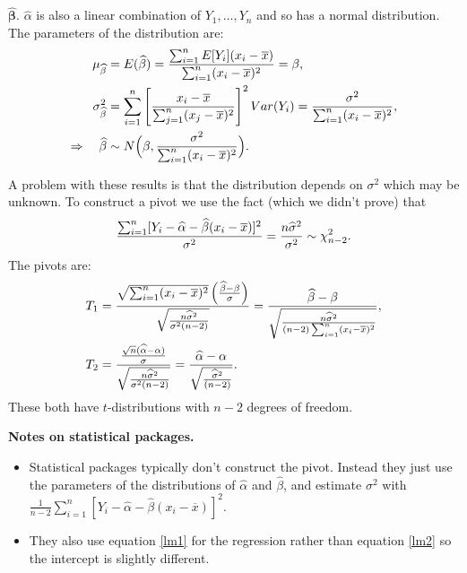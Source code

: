 \documentclass[10pt, two column]{article}
\begin{document}
$\boldsymbol{\widehat{\beta}}$. $\widehat{\alpha}$ is also a linear combination of $Y_{1}, \dots, Y_{n}$ and so has a normal distribution. The parameters of the distribution are: \vspace{-6pt}
\begin{align*}
\mu_{\widehat{\beta}} &= E(\widehat{\beta}) = \frac{\sum_{i=1}^{n} E[Y_{i}](x_{i} - \overline{x})}{\sum_{i=1}^{n} (x_{i} - \overline{x})^{2}} = \beta, \\
\sigma_{\widehat{\beta}}^{2} &= \sum_{i=1}^{n} \left[ \frac{x_{i} - \overline{x}}{\sum_{j=1}^{n} (x_{j} - \overline{x})^{2}} \right]^{2} Var(Y_{i}) = \frac{\sigma^{2}}{\sum_{i=1}^{n} (x_{i} - \overline{x})^{2}}, \\
\Rightarrow \quad \widehat{\beta} &\sim N\Big( \beta, \frac{\sigma^{2}}{\sum_{i=1}^{n} (x_{i} - \overline{x})^{2}} \Big). \vspace{-6pt}
\end{align*}

A problem with these results is that the distribution depends on $\sigma^{2}$ which may be unknown. To construct a pivot we use the fact (which we didn't prove) that \vspace{-6pt}
\begin{equation}
\frac{\sum_{i=1}^{n} [Y_{i} - \widehat{\alpha} - \widehat{\beta}(x_{i} - \overline{x})]^{2}}{\sigma^{2}} = \frac{n\widehat{\sigma}^{2}}{\sigma^{2}} \sim \chi_{n-2}^{2}. \label{vardist}
\vspace{-6pt}
\end{equation}
The pivots are: \vspace{-6pt}
\begin{align}
T_{1} &= \frac{\sqrt{\sum_{i=1}^{n} (x_{i} - \overline{x})^{2}}\left( \frac{\widehat{\beta} - \beta}{\sigma} \right)}{\sqrt{\frac{n\widehat{\sigma}^{2}}{\sigma^{2}(n-2)}}} = \frac{\widehat{\beta} - \beta}{\sqrt{ \frac{n\widehat{\sigma}^{2}}{(n-2)\sum_{i=1}^{n} (x_{i} - \overline{x})^{2}} }}, \label{dist alpha} \\
T_{2} &= \frac{ \frac{\sqrt{n}(\widehat{\alpha} - \alpha)}{\sigma} }{\sqrt{\frac{n\widehat{\sigma}^{2}}{\sigma^{2}(n-2)}}} = \frac{\widehat{\alpha} - \alpha}{\sqrt{ \frac{\widehat{\sigma}^{2}}{(n-2)} }}. \label{dist beta} \vspace{-6pt}
\end{align}
These both have $t$-distributions with $n-2$ degrees of freedom. 

{\bf Notes on statistical packages.}
\begin{itemize}
\item Statistical packages typically don't construct the pivot. Instead they just use the parameters of the distributions of $\widehat{\alpha}$ and $\widehat{\beta}$, and estimate $\sigma^{2}$ with $\frac{1}{n-2} \sum_{i=1}^{n} [Y_{i} - \widehat{\alpha} - \widehat{\beta}(x_{i} - \overline{x})]^{2}$. 
\item They also use equation \eqref{lm1} for the regression rather than equation \eqref{lm2} so the intercept is slightly different. 
\end{itemize}
\end{document}
